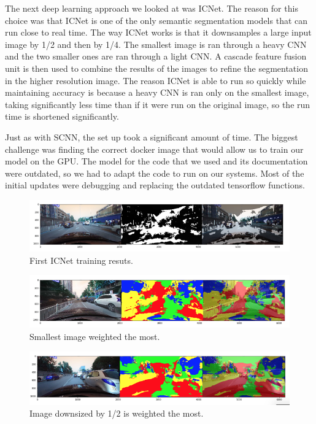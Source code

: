\documentclass[twoside,twocolumn]{article}
\begin{document}
\par The next deep learning approach we looked at was ICNet. The reason for this choice was that ICNet is one of the only semantic segmentation models that can run close to real time. The way ICNet works is that it downsamples a large input image by 1/2 and then by 1/4. The smallest image is ran through a heavy CNN and the two smaller ones are ran through a light CNN. A cascade feature fusion unit is then used to combine the results of the images to refine the segmentation in the higher resolution image. The reason ICNet is able to run so quickly while maintaining accuracy is because a heavy CNN is ran only on the smallest image, taking significantly less time than if it were run on the original image, so the run time is shortened significantly.
\par Just as with SCNN, the set up took a significant amount of time. The biggest challenge was finding the correct docker image that would allow us to train our model on the GPU. The model for the code that we used and its documentation were outdated, so we had to adapt the code to run on our systems. Most of the initial updates were debugging and replacing the outdated tensorflow functions.

\begin{figure}
  \includegraphics[width=\linewidth]{1.png}
  \caption{First ICNet training resuts.}
  \label{fig:first}
\end{figure}

\begin{figure}
  \includegraphics[width=\linewidth]{2.png}
  \caption{Smallest image weighted the most.}
  \label{fig:weights1}
\end{figure}

\begin{figure}
  \includegraphics[width=\linewidth]{3.png}
  \caption{Image downsized by 1/2 is weighted the most.}
  \label{fig:weights2}
\end{figure}
\end{document}
